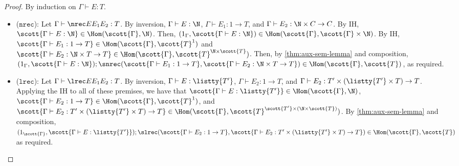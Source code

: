 \begin{proof}
By induction on $\Gamma \vdash E : T$.
\begin{itemize}
  \item ($\texttt{nrec}$): Let $\Gamma \vdash \nrec E {E_1} {E_2} : T$. By inversion, $\Gamma \vdash E : \N$, $\Gamma \vdash E_1 : 1 \to T$, and $\Gamma \vdash E_2 : \N \times C \to C$. By IH, $\scott{\Gamma \vdash E : \N} \in \Hom(\scott{\Gamma},\N)$. Then, $(1_{\Gamma},\scott{\Gamma \vdash E : \N}) \in \Hom(\scott{\Gamma},\scott{\Gamma}\times \N)$. By IH, $\scott{\Gamma \vdash E_1 : 1 \to T} \in \Hom(\scott{\Gamma},\scott{T}^1)$ and $\scott{\Gamma \vdash E_2 : \N \times T \to T} \in \Hom(\scott{\Gamma},\scott{T}^{\N \times \scott{T}})$. Then, by \autoref{thm:aux-sem-lemma} and composition, $(1_{\Gamma},\scott{\Gamma \vdash E : \N}) ; \snrec(\scott{\Gamma \vdash E_1 : 1 \to T},\scott{\Gamma \vdash E_2 : \N \times T \to T}) \in \Hom(\scott{\Gamma},\scott{T})$, as required.
  
  \item ($\texttt{lrec}$): Let $\Gamma \vdash \lrec E {E_1} {E_2} : T$. By inversion, $\Gamma \vdash E : \listty {T'}$, $\Gamma \vdash E_2 : 1 \to T$, and $\Gamma \vdash E_2 : T' \times (\listty {T'} \times T) \to T$. Applying the IH to all of these premises, we have that $\scott{\Gamma \vdash E : \listty {T'}} \in \Hom(\scott{\Gamma},\N)$, $\scott{\Gamma \vdash E_2 : 1 \to T} \in \Hom(\scott{\Gamma},\scott{T}^1)$, and $\scott{\Gamma \vdash E_2 : T' \times (\listty {T'} \times T) \to T} \in \Hom(\scott{\Gamma},\scott{T}^{\scott{T'}\times(\N\times\scott{T})})$. By \autoref{thm:aux-sem-lemma} and composition, $(1_{\scott{\Gamma}},\scott{\Gamma \vdash E : \listty {T'}}) ; \slrec(\scott{\Gamma \vdash E_2 : 1 \to T},\scott{\Gamma \vdash E_2 : T' \times (\listty {T'} \times T) \to T}) \in \Hom(\scott{\Gamma},\scott{T})$ as required.
\end{itemize}
\end{proof}
